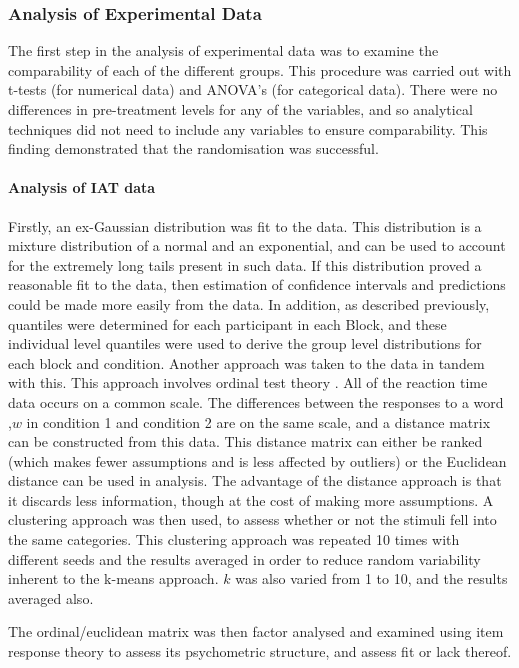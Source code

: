 \subsubsection{Analysis of Experimental Data}

The first step in the analysis of experimental data was to examine the comparability of each of the different groups. This procedure was carried out with t-tests (for numerical data) and ANOVA's (for categorical data). There were no differences in pre-treatment levels for any of the variables, and so analytical techniques did not need to include any variables to ensure comparability. This finding demonstrated that the randomisation was successful. 

\paragraph{Analysis of IAT data}

Firstly,  an ex-Gaussian distribution was fit to the data. This distribution is a mixture distribution of a normal and an exponential, and can be used to account for the extremely long tails present in such data. If this distribution proved a reasonable fit to the data, then estimation of confidence intervals and predictions could be made more easily from the data.
In addition, as described previously, quantiles were determined for each participant in each Block, and these individual level quantiles were used to derive the group level distributions for each block and condition. 
Another approach was taken to the data in tandem with this. This approach involves ordinal test theory \cite{schulman1975test}. All of the reaction time data occurs on a common scale. The differences between the responses to a word ,$w$ in condition 1 and condition 2 are on the same scale, and a distance matrix can be constructed from this data. This distance matrix can either be ranked (which makes fewer assumptions and is less affected by outliers) or the Euclidean distance can be used in analysis. The advantage of the distance approach is that it discards less information, though at the cost of making more assumptions. A clustering approach was then used, to assess whether or not the stimuli fell into the same categories. This clustering approach was repeated 10 times with different seeds and the results averaged in order to reduce random variability inherent to the k-means approach. $k$ was also varied from 1 to 10, and the results averaged also.

The ordinal/euclidean matrix was then factor analysed and examined using item response theory to assess its psychometric structure, and assess fit or lack thereof.

